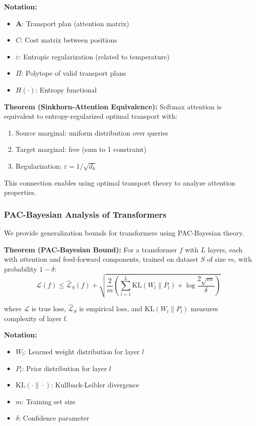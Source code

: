 \begin{notationbox}
\textbf{Notation:}
\begin{itemize}
    \item $\mathbf{A}$: Transport plan (attention matrix)
    \item $C$: Cost matrix between positions
    \item $\varepsilon$: Entropic regularization (related to temperature)
    \item $\Pi$: Polytope of valid transport plans
    \item $H(\cdot)$: Entropy functional
\end{itemize}
\end{notationbox}

\textbf{Theorem (Sinkhorn-Attention Equivalence):} Softmax attention is equivalent to entropy-regularized optimal transport with:
\begin{enumerate}
    \item Source marginal: uniform distribution over queries
    \item Target marginal: free (sum to 1 constraint)
    \item Regularization: $\varepsilon = 1/\sqrt{d_k}$
\end{enumerate}

This connection enables using optimal transport theory to analyze attention properties.

\subsubsection{PAC-Bayesian Analysis of Transformers}

We provide generalization bounds for transformers using PAC-Bayesian theory.

\textbf{Theorem (PAC-Bayesian Bound):} For a transformer $f$ with $L$ layers, each with attention and feed-forward components, trained on dataset $S$ of size $m$, with probability $1-\delta$:
\begin{equation}
\mathcal{L}(f) \leq \hat{\mathcal{L}}_S(f) + \sqrt{\frac{2}{m}\left(\sum_{l=1}^L \text{KL}(W_l \| P_l) + \log\frac{2\sqrt{m}}{\delta}\right)}
\end{equation}

where $\mathcal{L}$ is true loss, $\hat{\mathcal{L}}_S$ is empirical loss, and $\text{KL}(W_l \| P_l)$ measures complexity of layer $l$.

\begin{notationbox}
\textbf{Notation:}
\begin{itemize}
    \item $W_l$: Learned weight distribution for layer $l$
    \item $P_l$: Prior distribution for layer $l$
    \item $\text{KL}(\cdot \| \cdot)$: Kullback-Leibler divergence
    \item $m$: Training set size
    \item $\delta$: Confidence parameter
\end{itemize}
\end{notationbox}

